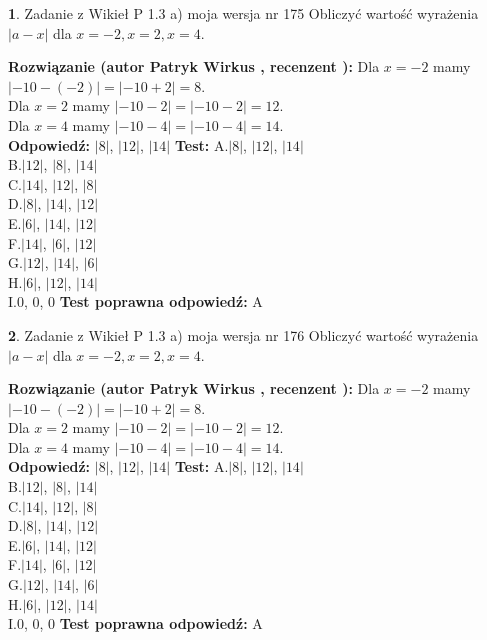 \documentclass[12pt, a4paper]{article}
\theoremstyle{definition} %
\newtheorem{zad}{}
\newcommand{\zadStart}[1]{\begin{zad}#1\newline}
\newcommand{\zadStop}{\end{zad}}
\newcommand{\rozwStart}[2]{\noindent \textbf{Rozwiązanie (autor #1 , recenzent #2): }\newline}
\newcommand{\rozwStop}{\newline}
\newcommand{\odpStart}{\noindent \textbf{Odpowiedź:}\newline}
\newcommand{\odpStop}{\newline}
\newcommand{\testStart}{\noindent \textbf{Test:}\newline}
\newcommand{\testStop}{\newline}
\newcommand{\kluczStart}{\noindent \textbf{Test poprawna odpowiedź:}\newline}
\newcommand{\kluczStop}{\newline}
\begin{document}
\zadStart{Zadanie z Wikieł P 1.3 a) moja wersja nr 175}
Obliczyć wartość wyrażenia $|a - x|$ dla $x=-2,x=2,x=4$.
\zadStop
\rozwStart{Patryk Wirkus}{}
Dla $x = -2$ mamy $|-10 - (-2)| = |-10 + 2| = 8$.\\
Dla $x = 2$ mamy $|-10 - 2| = |-10 - 2| = 12$.\\
Dla $x = 4$ mamy $|-10 - 4| = |-10 - 4| = 14$.\\
\rozwStop
\odpStart
$|8|$, $|12|$, $|14|$
\odpStop
\testStart
A.$|8|$, $|12|$, $|14|$\\
B.$|12|$, $|8|$, $|14|$\\
C.$|14|$, $|12|$, $|8|$\\
D.$|8|$, $|14|$, $|12|$\\
E.$|6|$, $|14|$, $|12|$\\
F.$|14|$, $|6|$, $|12|$\\
G.$|12|$, $|14|$, $|6|$\\
H.$|6|$, $|12|$, $|14|$\\
I.$0$, $0$, $0$
\testStop
\kluczStart
A
\kluczStop



\zadStart{Zadanie z Wikieł P 1.3 a) moja wersja nr 176}
Obliczyć wartość wyrażenia $|a - x|$ dla $x=-2,x=2,x=4$.
\zadStop
\rozwStart{Patryk Wirkus}{}
Dla $x = -2$ mamy $|-10 - (-2)| = |-10 + 2| = 8$.\\
Dla $x = 2$ mamy $|-10 - 2| = |-10 - 2| = 12$.\\
Dla $x = 4$ mamy $|-10 - 4| = |-10 - 4| = 14$.\\
\rozwStop
\odpStart
$|8|$, $|12|$, $|14|$
\odpStop
\testStart
A.$|8|$, $|12|$, $|14|$\\
B.$|12|$, $|8|$, $|14|$\\
C.$|14|$, $|12|$, $|8|$\\
D.$|8|$, $|14|$, $|12|$\\
E.$|6|$, $|14|$, $|12|$\\
F.$|14|$, $|6|$, $|12|$\\
G.$|12|$, $|14|$, $|6|$\\
H.$|6|$, $|12|$, $|14|$\\
I.$0$, $0$, $0$
\testStop
\kluczStart
A
\kluczStop
\end{document}
